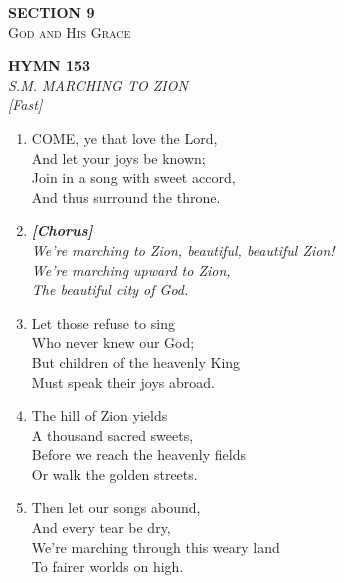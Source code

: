 \newpage
\thispagestyle{empty}
\vspace*{3.5cm}
\begin{center}
    {\LARGE \textbf{SECTION 9}}\\[0.8em]
    {\Large \textsc{God and His Grace}}
\end{center}
\vspace{3.5cm}

\newpage
\begin{center}
    {\Large \textbf{HYMN 153}}
    \\
    \textit{S.M. MARCHING TO ZION}
    \\
    \textit{\small [Fast]}
\end{center}
\vspace{1em}

\begin{enumerate}
    \item COME, ye that love the Lord, \\
        And let your joys be known; \\
        Join in a song with sweet accord, \\
        And thus surround the throne.

    \item[] \vspace{0.4em}
    \textbf{\textit{[Chorus]}} \\
    \textit{We're marching to Zion, beautiful, beautiful Zion!} \\
    \textit{We're marching upward to Zion,} \\
    \textit{The beautiful city of God.}
    \vspace{0.4em}

    \item Let those refuse to sing \\
        Who never knew our God; \\
        But children of the heavenly King \\
        Must speak their joys abroad.

    \item The hill of Zion yields \\
        A thousand sacred sweets, \\
        Before we reach the heavenly fields \\
        Or walk the golden streets.

    \item Then let our songs abound, \\
        And every tear be dry, \\
        We're marching through this weary land \\
        To fairer worlds on high.

\end{enumerate}

